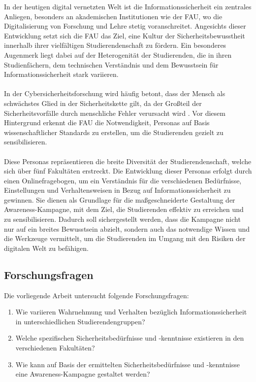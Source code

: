 \documentclass[german,report]{i1thesis}
\begin{document}
In der heutigen digital vernetzten Welt ist die Informationssicherheit ein zentrales Anliegen, besonders an akademischen Institutionen wie der FAU, wo die Digitalisierung von Forschung und Lehre stetig voranschreitet. Angesichts dieser Entwicklung setzt sich die FAU das Ziel, eine Kultur der Sicherheitsbewusstheit innerhalb ihrer vielfältigen Studierendenschaft zu fördern. Ein besonderes Augenmerk liegt dabei auf der Heterogenität der Studierenden, die in ihren Studienfächern, dem technischen Verständnis und dem Bewusstsein für Informationssicherheit stark variieren.\\
\\
In der Cybersicherheitsforschung wird häufig betont, dass der Mensch als schwächstes Glied in der Sicherheitskette gilt, da der Großteil der Sicherheitsvorfälle durch menschliche Fehler verursacht wird \cite{sebastian2021rethinking}. Vor diesem Hintergrund erkennt die FAU die Notwendigkeit, Personas auf Basis wissenschaftlicher Standards zu erstellen, um die Studierenden gezielt zu sensibilisieren.\\
\\
Diese Personas repräsentieren die breite Diversität der Studierendenschaft, welche sich über fünf Fakultäten erstreckt. Die Entwicklung dieser Personas erfolgt durch einen Onlinefragebogen, um ein Verständnis für die verschiedenen Bedürfnisse, Einstellungen und Verhaltensweisen in Bezug auf Informationssicherheit zu gewinnen. Sie dienen als Grundlage für die maßgeschneiderte Gestaltung der Awareness-Kampagne, mit dem Ziel, die Studierenden effektiv zu erreichen und zu sensibilisieren. Dadurch soll sichergestellt werden, dass die Kampagne nicht nur auf ein breites Bewusstsein abzielt, sondern auch das notwendige Wissen und die Werkzeuge vermittelt, um die Studierenden im Umgang mit den Risiken der digitalen Welt zu befähigen.

\subsection{Forschungsfragen}

Die vorliegende Arbeit untersucht folgende Forschungsfragen:

\begin{enumerate}
    \item Wie variieren Wahrnehmung und Verhalten bezüglich Informationssicherheit in unterschiedlichen Studierendengruppen?
    \item Welche spezifischen Sicherheitsbedürfnisse und -kenntnisse existieren in den verschiedenen Fakultäten?
    \item Wie kann auf Basis der ermittelten Sicherheitsbedürfnisse und -kenntnisse eine Awareness-Kampagne gestaltet werden?
\end{enumerate}
\end{document}
